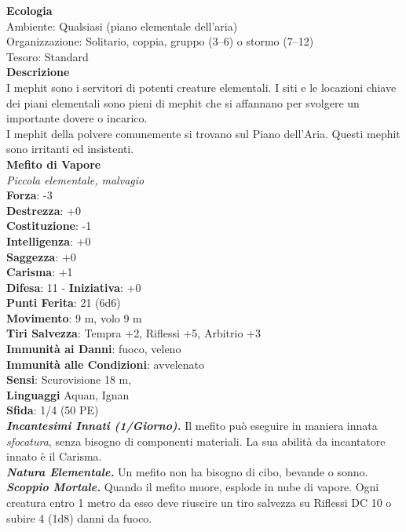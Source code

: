\begin{multicols}{2}
\textbf{Ecologia}\\
Ambiente: Qualsiasi (piano elementale dell'aria)\\
Organizzazione: Solitario, coppia, gruppo (3–6) o stormo (7–12)\\
Tesoro: Standard\\
\textbf{Descrizione}\\
I mephit sono i servitori di potenti creature elementali. I siti e le locazioni chiave dei piani elementali sono pieni di mephit che si affannano per svolgere un importante dovere o incarico.\\
I mephit della polvere comunemente si trovano sul Piano dell'Aria. Questi mephit sono irritanti ed insistenti.\\


\medskip\textbf{Mefito di Vapore}\\
\emph{Piccola elementale, malvagio}\\
\textbf{Forza}: -3\\
\textbf{Destrezza}: +0\\
\textbf{Costituzione}: -1\\
\textbf{Intelligenza}: +0\\
\textbf{Saggezza}: +0\\
\textbf{Carisma}: +1\\
\textbf{Difesa}: 11 - \textbf{Iniziativa}: +0\\
\textbf{Punti Ferita}: 21 (6d6)\\
\textbf{Movimento}: 9 m, volo 9 m\\
\textbf{Tiri Salvezza}: Tempra +2, Riflessi +5, Arbitrio +3\\
\textbf{Immunità ai Danni}: fuoco, veleno\\
\textbf{Immunità alle Condizioni}: avvelenato\\
\textbf{Sensi}: Scurovisione 18 m, \\
\textbf{Linguaggi} Aquan, Ignan\\
\textbf{Sfida}: 1/4 (50 PE)\smallskip\\
\emph{\textbf{Incantesimi Innati (1/Giorno).}} Il mefito può eseguire in maniera innata \emph{sfocatura}, senza bisogno di componenti materiali. La sua abilità da incantatore innato è il Carisma.\\
\emph{\textbf{Natura Elementale.}} Un mefito non ha bisogno di cibo, bevande o sonno.\\
\emph{\textbf{Scoppio Mortale.}} Quando il mefito muore, esplode in nube di vapore. Ogni creatura entro 1 metro da esso deve riuscire un tiro salvezza su Riflessi DC 10 o subire 4 (1d8) danni da fuoco. \\

\end{multicols}
